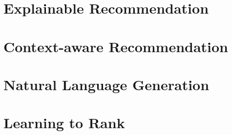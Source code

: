 

\section{Explainable Recommendation}


\section{Context-aware Recommendation}


\section{Natural Language Generation}


\section{Learning to Rank}

